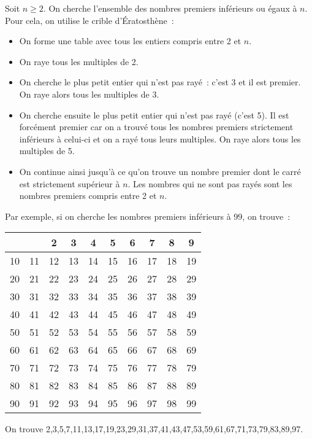 \documentclass{magnolia}
\begin{document}
\begin{remarqueUnique}
\remarque Soit $n\geq 2$. On cherche l'ensemble des nombres premiers inférieurs
  ou égaux à $n$. Pour cela, on utilise le crible d'Ératosthène~:
  \begin{itemize}
  \item On forme une table avec tous les entiers compris entre 2 et $n$.
  \item On raye tous les multiples de 2.
  \item On cherche le plus petit entier qui n'est pas rayé~: c'est 3 et il est
    premier. On raye alors tous les multiples de 3.
  \item On cherche ensuite le plus petit entier qui n'est pas rayé (c'est 5).
    Il est forcément premier car on a trouvé tous les nombres premiers
    strictement inférieurs à celui-ci et on a rayé tous leurs multiples.
    On raye alors tous les multiples de 5.
  \item On continue ainsi jusqu'à ce qu'on trouve un nombre premier dont le
    carré est strictement supérieur à $n$. Les nombres qui ne sont pas rayés
    sont les nombres premiers compris entre 2 et $n$.
  \end{itemize}
  Par exemple, si on cherche les nombres premiers inférieurs à 99, on trouve~:
  \begin{center}
    \begin{tabular}{|c|c|c|c|c|c|c|c|c|c|}
    \hline
       &    &  2 &  3 &  4 &  5 &  6 &  7 &  8 &  9\\\hline
    10 & 11 & 12 & 13 & 14 & 15 & 16 & 17 & 18 & 19\\\hline
    20 & 21 & 22 & 23 & 24 & 25 & 26 & 27 & 28 & 29\\\hline
    30 & 31 & 32 & 33 & 34 & 35 & 36 & 37 & 38 & 39\\\hline
    40 & 41 & 42 & 43 & 44 & 45 & 46 & 47 & 48 & 49\\\hline
    50 & 51 & 52 & 53 & 54 & 55 & 56 & 57 & 58 & 59\\\hline
    60 & 61 & 62 & 63 & 64 & 65 & 66 & 67 & 68 & 69\\\hline
    70 & 71 & 72 & 73 & 74 & 75 & 76 & 77 & 78 & 79\\\hline
    80 & 81 & 82 & 83 & 84 & 85 & 86 & 87 & 88 & 89\\\hline
    90 & 91 & 92 & 93 & 94 & 95 & 96 & 97 & 98 & 99\\\hline
    \end{tabular}
  \end{center}
  \begin{sol}
  On trouve
  2,3,5,7,11,13,17,19,23,29,31,37,41,43,47,53,59,61,67,71,73,79,83,89,97.
  \end{sol}
\end{remarqueUnique}
\end{document}
